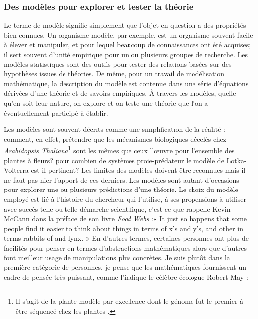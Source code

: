 \subsubsection*{Des modèles pour explorer et tester la
théorie}\label{des-moduxe8les-pour-explorer-et-tester-la-thuxe9orie}

Le terme de modèle signifie simplement que l'objet en question a des
propriétés bien connues. Un organisme modèle, par exemple, est un
organisme souvent facile à élever et manipuler, et pour lequel beaucoup
de connaissances ont été acquises; il sert souvent d'unité empirique
pour un ou plusieurs groupes de recherche. Les modèles statistiques sont
des outils pour tester des relations basées sur des hypothèses issues de
théories. De même, pour un travail de modélisation mathématique, la
description du modèle est contenue dans une série d'équations dérivées
d'une théorie et de savoirs empiriques. À travers les modèles, quelle
qu'en soit leur nature, on explore et on teste une théorie que l'on a
éventuellement participé à établir.

Les modèles sont souvent décrits comme une simplification de la réalité
: comment, en effet, prétendre que les mécanismes biologiques décelés
chez \emph{Arabidopsis Thaliana}\footnote{Il s'agit de la plante modèle
  par excellence dont le génome fut le premier à être séquencé chez les
  plantes \citep{TheArabidopsisGenomeInitiative2000}.} sont les mêmes
que ceux l'œuvre pour l'ensemble des plantes à fleurs? pour combien de
systèmes proie-prédateur le modèle de Lotka-Volterra est-il pertinent?
Les limites des modèles doivent être reconnues mais il ne faut pas nier
l'apport de ces derniers. Les modèles sont autant d'occasions pour
explorer une ou plusieurs prédictions d'une théorie. Le choix du modèle
employé est lié à l'histoire du chercheur qui l'utilise, à ses
propensions à utiliser avec succès telle ou telle démarche scientifique,
c'est ce que rappelle Kevin McCann dans la préface de son livre
\emph{Food Webs} \citep{mccann2011food} :« It just so happens that some
people find it easier to think about things in terms of x's and y's, and
other in terms rabbits of and lynx. » En d'autres termes, certaines
personnes ont plus de facilités pour penser en termes d'abstractions
mathématiques alors que d'autres font meilleur usage de manipulations
plus concrètes. Je suis plutôt dans la première catégorie de personnes,
je pense que les mathématiques fournissent un cadre de pensée très
puissant, comme l'indique le célèbre écologue Robert May
\citep[p.~791]{May2004} :

